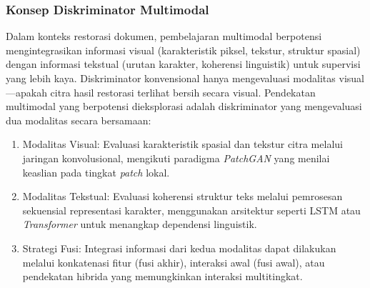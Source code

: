 \subsubsection{Konsep Diskriminator Multimodal}
\label{subsubsec:konsep-diskriminator-multimodal}

Dalam konteks restorasi dokumen, pembelajaran multimodal berpotensi mengintegrasikan informasi visual (karakteristik piksel, tekstur, struktur spasial) dengan informasi tekstual (urutan karakter, koherensi linguistik) untuk supervisi yang lebih kaya. Diskriminator konvensional hanya mengevaluasi modalitas visual—apakah citra hasil restorasi terlihat bersih secara visual. Pendekatan multimodal yang berpotensi dieksplorasi adalah diskriminator yang mengevaluasi dua modalitas secara bersamaan:

\begin{enumerate}[leftmargin=1.5em, labelsep=0.5em, itemindent=0pt, label=\alph*., topsep=0pt, parsep=0pt, itemsep=0pt]
      \item Modalitas Visual: \mbox{} Evaluasi karakteristik spasial dan tekstur citra melalui jaringan konvolusional, mengikuti paradigma \textit{PatchGAN} \parencite{isola2017} yang menilai keaslian pada tingkat \textit{patch} lokal.

      \item Modalitas Tekstual: \mbox{} Evaluasi koherensi struktur teks melalui pemrosesan sekuensial representasi karakter, menggunakan arsitektur seperti LSTM atau \textit{Transformer} untuk menangkap dependensi linguistik.

      \item Strategi Fusi: \mbox{} Integrasi informasi dari kedua modalitas dapat dilakukan melalui konkatenasi fitur (fusi akhir), interaksi awal (fusi awal), atau pendekatan hibrida yang memungkinkan interaksi multitingkat.
\end{enumerate}

